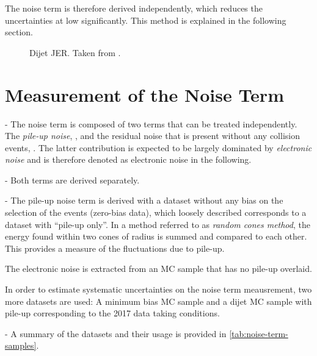 The noise term is therefore derived independently, which reduces the uncertainties at low \pT significantly. This method is explained in the following section.

\FloatBarrier
\begin{figure}
    \caption{Dijet JER. Taken from .}
    \label{fig:insitu-jer-dijet-only}
\end{figure}


\section{Measurement of the Noise Term}
\label{sec:noise-term-meas}
- The noise term is composed of two terms that can be treated independently. The \emph{pile-up noise}, \Npileup, and the residual noise that is present without any collision events, \Nmuzero. The latter contribution is expected to be largely dominated by \emph{electronic noise} and is therefore denoted as electronic noise in the following.

- Both terms are derived separately.

- The pile-up noise term is derived with a dataset without any bias on the selection of the events (zero-bias data), which loosely described corresponds to a dataset with ``pile-up only''.
In a method referred to as \emph{random cones method}, the energy found within two cones of radius \Rrandomcone is summed and compared to each other. This provides a measure of the fluctuations due to pile-up.

The electronic noise is extracted from an MC sample that has no pile-up overlaid.

In order to estimate systematic uncertainties on the noise term meausrement, two more datasets are used: A minimum bias MC sample and a dijet MC sample with pile-up corresponding to the 2017 data taking conditions.

- A summary of the datasets and their usage is provided in \cref{tab:noise-term-samples}.



